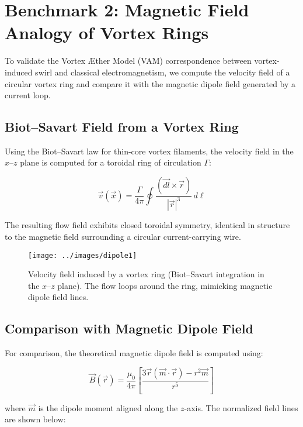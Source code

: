 \section{Benchmark 2: Magnetic Field Analogy of Vortex Rings}

To validate the Vortex Æther Model (VAM) correspondence between vortex-induced swirl and classical electromagnetism, we compute the velocity field of a circular vortex ring and compare it with the magnetic dipole field generated by a current loop.

\subsection{Biot–Savart Field from a Vortex Ring}

Using the Biot–Savart law for thin-core vortex filaments, the velocity field in the $x$–$z$ plane is computed for a toroidal ring of circulation $\Gamma$:

\begin{equation}
\vec{v}(\vec{x}) = \frac{\Gamma}{4\pi} \oint \frac{(\vec{dl} \times \vec{r})}{|\vec{r}|^3} \, d\ell
\end{equation}

\noindent
The resulting flow field exhibits closed toroidal symmetry, identical in structure to the magnetic field surrounding a circular current-carrying wire.

\begin{figure}[H]
    \centering
    \texttt{[image: ../images/dipole1]}
    \caption{Velocity field induced by a vortex ring (Biot–Savart integration in the $x$–$z$ plane). The flow loops around the ring, mimicking magnetic dipole field lines.}
\end{figure}

\subsection{Comparison with Magnetic Dipole Field}

For comparison, the theoretical magnetic dipole field is computed using:

\begin{equation}
\vec{B}(\vec{r}) = \frac{\mu_0}{4\pi} \left[ \frac{3\vec{r}(\vec{m} \cdot \vec{r}) - r^2 \vec{m}}{r^5} \right]
\end{equation}

\noindent
where $\vec{m}$ is the dipole moment aligned along the $z$-axis. The normalized field lines are shown below:

